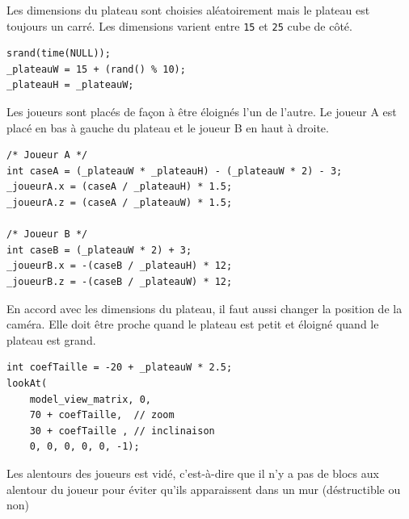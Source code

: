 \documentclass{article}
\begin{document}
    Les dimensions du plateau sont choisies aléatoirement mais le plateau est toujours un carré. Les dimensions varient entre \texttt{15} et \texttt{25} cube de côté.
    \begin{center}\begin{minipage}{0.5\textwidth}
        \begin{verbatim}
srand(time(NULL));
_plateauW = 15 + (rand() % 10);
_plateauH = _plateauW;
        \end{verbatim}
    \end{minipage}\end{center}
    \vspace{10pt}

    Les joueurs sont placés de façon à être éloignés l'un de l'autre. Le joueur A est placé en bas à gauche du plateau et le joueur B en haut à droite.
    \begin{center}\begin{minipage}{0.8\textwidth}
        \begin{verbatim}
/* Joueur A */
int caseA = (_plateauW * _plateauH) - (_plateauW * 2) - 3;
_joueurA.x = (caseA / _plateauH) * 1.5;
_joueurA.z = (caseA / _plateauW) * 1.5;

/* Joueur B */
int caseB = (_plateauW * 2) + 3;
_joueurB.x = -(caseB / _plateauH) * 12;
_joueurB.z = -(caseB / _plateauW) * 12;
        \end{verbatim}
    \end{minipage}\end{center}
    \vspace{10pt}

    En accord avec les dimensions du plateau, il faut aussi changer la position de la caméra. Elle doit être proche quand le plateau est petit et éloigné quand le plateau est grand.
    \begin{center}\begin{minipage}{0.5\textwidth}
        \begin{verbatim}
int coefTaille = -20 + _plateauW * 2.5;
lookAt(
    model_view_matrix, 0,
    70 + coefTaille,  // zoom
    30 + coefTaille , // inclinaison
    0, 0, 0, 0, 0, -1);
        \end{verbatim}
    \end{minipage}\end{center}
    \vspace{10pt}

    Les alentours des joueurs est vidé, c'est-à-dire que il n'y a pas de blocs aux alentour du joueur pour éviter qu'ils apparaissent dans un mur (déstructible ou non)
    \vspace{10pt}
\end{document}
